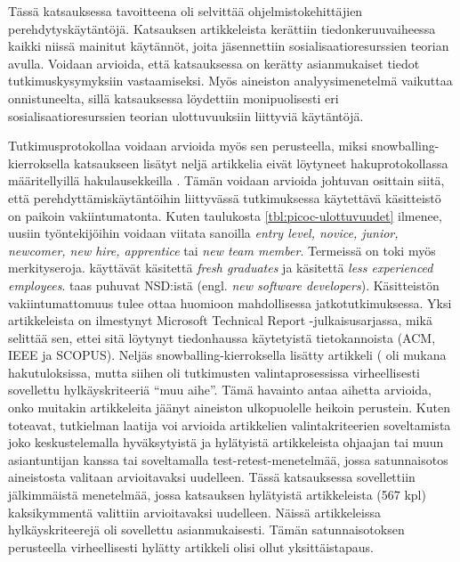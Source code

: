 \documentclass[utf8]{gradu3}
\begin{document}
Tässä katsauksessa tavoitteena oli selvittää ohjelmistokehittäjien perehdytyskäytäntöjä. Katsauksen artikkeleista kerättiin tiedonkeruuvaiheessa kaikki niissä mainitut käytännöt, joita jäsennettiin sosialisaatioresurssien teorian avulla. Voidaan arvioida, että katsauksessa on kerätty asianmukaiset tiedot tutkimuskysymyksiin vastaamiseksi. Myös aineiston analyysimenetelmä vaikuttaa onnistuneelta, sillä katsauksessa löydettiin monipuolisesti eri sosialisaatioresurssien teorian ulottuvuuksiin liittyviä käytäntöjä.

Tutkimusprotokollaa voidaan arvioida myös sen perusteella, miksi snowballing-kierroksella katsaukseen lisätyt neljä artikkelia eivät löytyneet hakuprotokollassa määritellyillä hakulausekkeilla %
\parencites%
    {bjornson-dingsøyr-2005}%
    {kulkarni-ym-2010}%
    {hemphill-begel-2011}%
    {viviani-murphy-2019}%
\relax.
%
Tämän voidaan arvioida johtuvan osittain siitä, että perehdyttämiskäytäntöihin liittyvässä tutkimuksessa käytettävä käsitteistö on paikoin vakiintumatonta. Kuten taulukosta \ref{tbl:picoc-ulottuvuudet} ilmenee, uusiin työntekijöihin voidaan viitata sanoilla \textit{entry level, novice, junior, newcomer, new hire, apprentice} tai \textit{new team member}. Termeissä on toki myös merkityseroja. \textcite{kulkarni-ym-2010} käyttävät käsitettä \textit{fresh graduates} ja \textcite{bjornson-dingsøyr-2005} käsitettä \textit{less experienced employees}. \textcite{begel-simon-2008} taas puhuvat NSD:istä (engl. \textit{new software developers}). Käsitteistön vakiintumattomuus tulee ottaa huomioon mahdollisessa jatkotutkimuksessa. Yksi artikkeleista \parencite{hemphill-begel-2011} on ilmestynyt Microsoft Technical Report -julkaisusarjassa, mikä selittää sen, ettei sitä löytynyt tiedonhaussa käytetyistä tietokannoista (ACM, IEEE ja SCOPUS). Neljäs snowballing-kierroksella lisätty artikkeli (\textcite{viviani-murphy-2019} oli mukana hakutuloksissa, mutta siihen oli tutkimusten valintaprosessissa virheellisesti sovellettu hylkäyskriteeriä ``muu aihe''. Tämä havainto antaa aihetta arvioida, onko muitakin artikkeleita jäänyt aineiston ulkopuolelle heikoin perustein. Kuten \textcite{kitchenham-charters-2007} toteavat, tutkielman laatija voi arvioida artikkelien valintakriteerien soveltamista joko keskustelemalla hyväksytyistä ja hylätyistä artikkeleista ohjaajan tai muun asiantuntijan kanssa tai soveltamalla test-retest-menetelmää, jossa satunnaisotos aineistosta valitaan arvioitavaksi uudelleen. Tässä katsauksessa sovellettiin jälkimmäistä menetelmää, jossa katsauksen hylätyistä artikkeleista (567 kpl) kaksikymmentä valittiin arvioitavaksi uudelleen. Näissä artikkeleissa hylkäyskriteerejä oli sovellettu asianmukaisesti. Tämän satunnaisotoksen perusteella virheellisesti hylätty artikkeli \parencite{viviani-murphy-2019} olisi ollut yksittäistapaus. 
\end{document}
